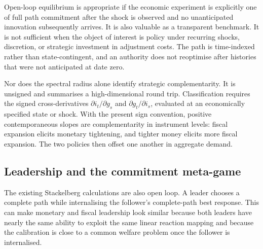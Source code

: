 \documentclass[11pt]{article}
\begin{document}
Open-loop equilibrium is appropriate if the economic experiment is explicitly
one of full path commitment after the shock is observed and no unanticipated
innovation subsequently arrives.  It is also valuable as a transparent
benchmark.  It is not sufficient when the object of interest is policy under
recurring shocks, discretion, or strategic investment in adjustment costs.
The path is time-indexed rather than state-contingent, and an authority does not
reoptimise after histories that were not anticipated at date zero.

Nor does the spectral radius alone identify strategic complementarity.  It is
unsigned and summarises a high-dimensional round trip.  Classification requires
the signed cross-derivatives $\partial i_t/\partial g_s$ and
$\partial g_t/\partial i_s$, evaluated at an economically specified state or
shock.  With the present sign convention, positive contemporaneous slopes are
complementarity in instrument levels: fiscal expansion elicits monetary
tightening, and tighter money elicits more fiscal expansion.  The two policies
then offset one another in aggregate demand.

\subsection{Leadership and the commitment meta-game}

The existing Stackelberg calculations are also open loop.  A leader chooses a
complete path while internalising the follower's complete-path best response.
This can make monetary and fiscal leadership look similar because both leaders
have nearly the same ability to exploit the same linear reaction mapping and
because the calibration is close to a common welfare problem once the follower
is internalised.
\end{document}
